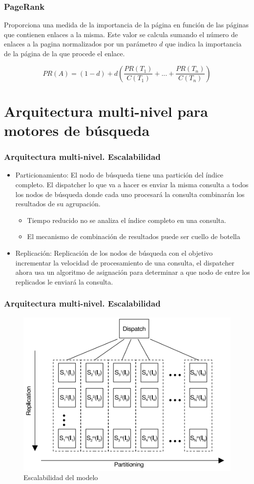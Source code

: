 \documentclass[9pt]{beamer} %
\begin{document}
\begin{frame}
	\frametitle{PageRank}
Proporciona una medida de la importancia de la página en función de las páginas que contienen enlaces a la misma. Este valor se calcula sumando el número de enlaces a la pagina normalizados por un parámetro $d$ que indica la importancia de la página de la que procede el enlace.

\[
PR(A)=(1-d)+d(\frac{PR(T_1)}{C(T_1)}+...+\frac{PR(T_n)}{C(T_n)})
\]
\end{frame}
\section{Arquitectura multi-nivel para motores de búsqueda}
\begin{frame}
	\frametitle{Arquitectura multi-nivel. Escalabilidad}
	\begin{itemize}
		\item Particionamiento: El nodo de búsqueda tiene una partición del índice completo. El dispatcher lo que va a hacer es enviar la misma consulta a todos los nodos de búsqueda donde cada uno procesará la consulta combinarán los resultados de su agrupación.
		\begin{itemize}
			\item Tiempo reducido no se analiza el índice completo en una consulta.
			\item El mecanismo de combinación de resultados puede ser cuello de botella
		\end{itemize}
		\item Replicación: Replicación de los nodos de búsqueda con el objetivo incrementar la velocidad de procesamiento de una consulta, el dispatcher ahora usa un algoritmo de asignación para determinar a que nodo de entre los replicados le enviará la consulta.
	\end{itemize}
\end{frame}
\begin{frame}
	\frametitle{Arquitectura multi-nivel. Escalabilidad}
	\begin{figure}[H]
			\centering
			\includegraphics[scale=0.75]{./img/multitier.png}
			\caption{Escalabilidad del modelo}
			\label{fig:my_label}
	\end{figure}
\end{frame}
\end{document}
